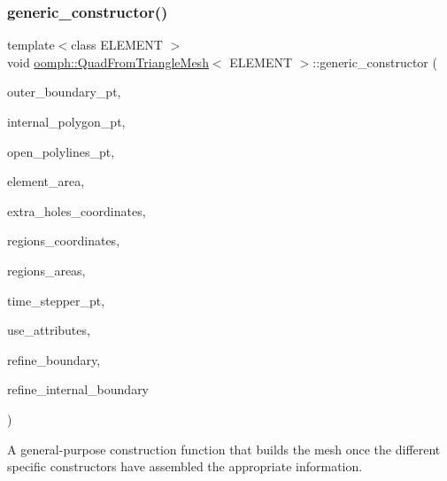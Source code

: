 \subsubsection{\texorpdfstring{generic\+\_\+constructor()}{generic\_constructor()}}
{\footnotesize\ttfamily template$<$class E\+L\+E\+M\+E\+NT $>$ \\
void \hyperlink{classoomph_1_1QuadFromTriangleMesh}{oomph\+::\+Quad\+From\+Triangle\+Mesh}$<$ E\+L\+E\+M\+E\+NT $>$\+::generic\+\_\+constructor (\begin{DoxyParamCaption}\item[{\hyperlink{classoomph_1_1Vector}{Vector}$<$ \hyperlink{classoomph_1_1TriangleMeshPolygon}{Triangle\+Mesh\+Polygon} $\ast$$>$ \&}]{outer\+\_\+boundary\+\_\+pt,  }\item[{\hyperlink{classoomph_1_1Vector}{Vector}$<$ \hyperlink{classoomph_1_1TriangleMeshPolygon}{Triangle\+Mesh\+Polygon} $\ast$$>$ \&}]{internal\+\_\+polygon\+\_\+pt,  }\item[{\hyperlink{classoomph_1_1Vector}{Vector}$<$ \hyperlink{classoomph_1_1TriangleMeshOpenCurve}{Triangle\+Mesh\+Open\+Curve} $\ast$$>$ \&}]{open\+\_\+polylines\+\_\+pt,  }\item[{const double \&}]{element\+\_\+area,  }\item[{\hyperlink{classoomph_1_1Vector}{Vector}$<$ \hyperlink{classoomph_1_1Vector}{Vector}$<$ double $>$ $>$ \&}]{extra\+\_\+holes\+\_\+coordinates,  }\item[{std\+::map$<$ unsigned, \hyperlink{classoomph_1_1Vector}{Vector}$<$ double $>$ $>$ \&}]{regions\+\_\+coordinates,  }\item[{std\+::map$<$ unsigned, double $>$ \&}]{regions\+\_\+areas,  }\item[{\hyperlink{classoomph_1_1TimeStepper}{Time\+Stepper} $\ast$}]{time\+\_\+stepper\+\_\+pt,  }\item[{const bool \&}]{use\+\_\+attributes,  }\item[{const bool \&}]{refine\+\_\+boundary,  }\item[{const bool \&}]{refine\+\_\+internal\+\_\+boundary }\end{DoxyParamCaption})\hspace{0.3cm}{\ttfamily [inline]}}



A general-\/purpose construction function that builds the mesh once the different specific constructors have assembled the appropriate information. 



